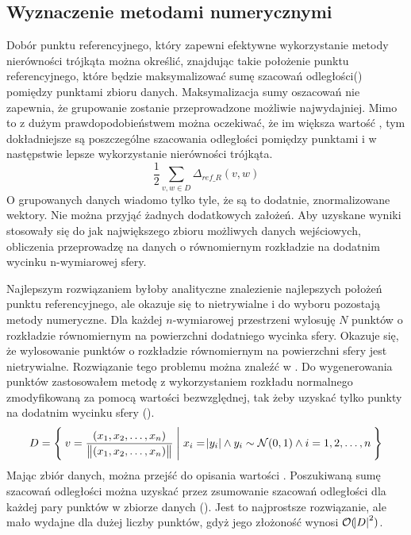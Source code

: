 \subsection{Wyznaczenie metodami numerycznymi}
Dobór punktu referencyjnego, który zapewni efektywne wykorzystanie metody nierówności trójkąta można określić, znajdując takie położenie punktu referencyjnego, które będzie maksymalizować sumę szacowań odległości\linebreak () pomiędzy punktami zbioru danych. Maksymalizacja sumy oszacowań nie zapewnia, że grupowanie zostanie przeprowadzone możliwie najwydajniej. Mimo to z dużym prawdopodobieństwem można oczekiwać, że im większa wartość , tym dokładniejsze są poszczególne szacowania odległości pomiędzy punktami i w następstwie lepsze wykorzystanie nierówności trójkąta.
\begin{equation}
	\frac{1}{2}\sum_{v,w \in D} \Delta_{ref\_R}(v,w)
	\label{ti:max-ti-d}
\end{equation}
O grupowanych danych wiadomo tylko tyle, że są to dodatnie, znormalizowane wektory. Nie można przyjąć żadnych dodatkowych założeń. Aby uzyskane wyniki stosowały się do jak największego zbioru możliwych danych wejściowych, obliczenia przeprowadzę na danych o równomiernym rozkładzie na dodatnim wycinku n-wymiarowej sfery.\par
Najlepszym rozwiązaniem byłoby analityczne znalezienie najlepszych położeń punktu referencyjnego, ale okazuje się to nietrywialne i do wyboru pozostają metody numeryczne. Dla każdej $ n $-wymiarowej przestrzeni wylosuję $ N $ punktów o rozkładzie równomiernym na powierzchni dodatniego wycinka sfery. Okazuje się, że wylosowanie punktów o rozkładzie równomiernym na powierzchni sfery jest nietrywialne. Rozwiązanie tego problemu można znaleźć w \cite{pickfromsphere}. Do wygenerowania punktów zastosowałem metodę z wykorzystaniem rozkładu normalnego zmodyfikowaną za pomocą wartości bezwzględnej, tak żeby uzyskać tylko punkty na dodatnim wycinku sfery (). 
\begin{equation}
	D = \Set{ v = \frac{(x_1, x_2, \dots, x_n)}{\,\norm{(x_1, x_2, \dots, x_n)}} | x_i=\abs{y_i} \land y_i \sim \mathcal{N}(0,1) \land i=1,2,\dots,n}
	\label{ti:uni-rand-on-sphere}
\end{equation}
Mając zbiór danych, można przejść do opisania wartości . Poszukiwaną sumę szacowań odległości można uzyskać przez zsumowanie szacowań odległości dla każdej pary punktów w zbiorze danych (). Jest to najprostsze rozwiązanie, ale mało wydajne dla dużej liczby punktów, gdyż jego złożoność wynosi $ \mathcal{O}(\abs{D}^2) $.\par
